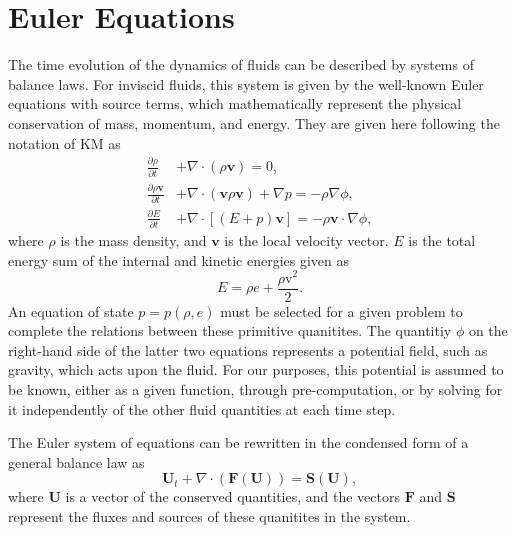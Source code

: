 \section{Euler Equations}
\label{sec:euler}

The time evolution of the dynamics of fluids can be described by systems of balance laws. For inviscid fluids, this system is given by the well-known Euler equations with source terms, which mathematically represent the physical conservation of mass, momentum, and energy. They are given here following the notation of KM as
\begin{subequations} \label{eq:eulerFull}
\begin{align}
\frac{\partial{\rho}}{\partial{t}} &+ \nabla \cdot (\rho \mathbf{v}) = 0, \label{eq:eulerContinuity} \\
\frac{\partial{\rho \mathbf{v}}}{\partial{t}} &+ \nabla \cdot (\mathbf{v} \rho \mathbf{v}) + \nabla p = -\rho \nabla \phi, \label{eq:eulerMomentum} \\
\frac{\partial{E}}{\partial{t}} &+ \nabla \cdot \left[(E+p)\mathbf{v}\right] = -\rho \mathbf{v} \cdot \nabla \phi,  \label{eq:eulerEnergy} 
\end{align}
\end{subequations}
where $\rho$ is the mass density, and $\mathbf{v}$ is the local velocity vector. $E$ is the total energy sum of the internal and kinetic energies given as
\begin{equation}
E=\rho e + \frac{\rho \mathrm{v}^2}{2}.
\end{equation}
An equation of state $p=p(\rho,e)$ must be selected for a given problem to complete the relations between these primitive quanitites. The quantitiy $\phi$ on the right-hand side of the latter two equations represents a potential field, such as gravity, which acts upon the fluid. For our purposes, this potential is assumed to be known, either as a given function, through pre-computation, or by solving for it independently of the other fluid quantities at each time step.

The Euler system of equations can be rewritten in the condensed form of a general balance law as
\begin{equation} \label{eq:euler}
\mathbf{U}_t+\nabla\cdot(\mathbf{F}(\mathbf{U}))=\mathbf{S}(\mathbf{U}),
\end{equation}
where $\mathbf{U}$ is a vector of the conserved quantities, and the vectors $\mathbf{F}$ and $\mathbf{S}$ represent the fluxes and sources of these quanitites in the system.

